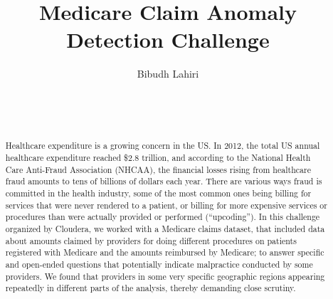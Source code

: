 \documentclass{sig-alternate}
\begin{document}
\title{Medicare Claim Anomaly Detection Challenge}

\author{
\alignauthor
Bibudh Lahiri\\
       \\
       \\
       \\
}

\maketitle
\begin{abstract}
Healthcare expenditure is a growing concern in the US. In 2012, the total US annual healthcare expenditure reached \$2.8 trillion, and according to the National Health Care Anti-Fraud Association (NHCAA), the financial losses rising from healthcare fraud amounts to tens of billions of dollars each year. There are various ways fraud is committed in the health industry, some of the most common ones being billing for services that were never rendered to a patient, or billing for more expensive services or procedures than were actually provided or performed (``upcoding''). In this challenge organized by Cloudera, we worked with a Medicare claims dataset, that included data about amounts claimed by providers for doing different procedures on patients registered with Medicare and the amounts reimbursed by Medicare; to answer specific and open-ended questions that potentially indicate malpractice conducted by some providers. We found that providers in some very specific geographic regions appearing repeatedly in different parts of the analysis, thereby demanding close scrutiny. 
\end{abstract}


%
%





  
\end{document}
